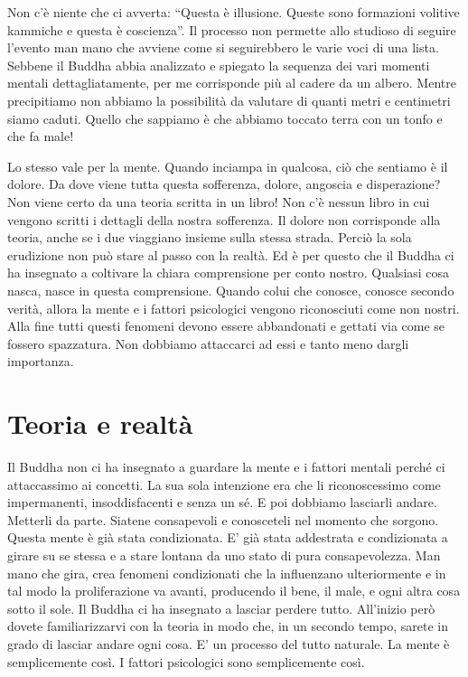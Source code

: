 Non c'è niente che ci avverta: ``Questa è illusione. Queste sono
formazioni volitive kammiche e questa è coscienza''. Il processo non
permette allo studioso di seguire l'evento man mano che avviene come si
seguirebbero le varie voci di una lista. Sebbene il Buddha abbia
analizzato e spiegato la sequenza dei vari momenti mentali
dettagliatamente, per me corrisponde più al cadere da un albero. Mentre
precipitiamo non abbiamo la possibilità da valutare di quanti metri e
centimetri siamo caduti. Quello che sappiamo è che abbiamo toccato terra
con un tonfo e che fa male!

Lo stesso vale per la mente. Quando inciampa in qualcosa, ciò che
sentiamo è il dolore. Da dove viene tutta questa sofferenza, dolore,
angoscia e disperazione? Non viene certo da una teoria scritta in un
libro! Non c'è nessun libro in cui vengono scritti i dettagli della
nostra sofferenza. Il dolore non corrisponde alla teoria, anche se i due
viaggiano insieme sulla stessa strada. Perciò la sola erudizione non può
stare al passo con la realtà. Ed è per questo che il Buddha ci ha
insegnato a coltivare la chiara comprensione per conto nostro. Qualsiasi
cosa nasca, nasce in questa comprensione. Quando colui che conosce,
conosce secondo verità, allora la mente e i fattori psicologici vengono
riconosciuti come non nostri. Alla fine tutti questi fenomeni devono
essere abbandonati e gettati via come se fossero spazzatura. Non
dobbiamo attaccarci ad essi e tanto meno dargli importanza.

\section{Teoria e realtà}

Il Buddha non ci ha insegnato a guardare la mente e i fattori mentali
perché ci attaccassimo ai concetti. La sua sola intenzione era che li
riconoscessimo come impermanenti, insoddisfacenti e senza un sé. E poi
dobbiamo lasciarli andare. Metterli da parte. Siatene consapevoli e
conosceteli nel momento che sorgono. Questa mente è già stata
condizionata. E' già stata addestrata e condizionata a girare su se
stessa e a stare lontana da uno stato di pura consapevolezza. Man mano
che gira, crea fenomeni condizionati che la influenzano ulteriormente e
in tal modo la proliferazione va avanti, producendo il bene, il male, e
ogni altra cosa sotto il sole. Il Buddha ci ha insegnato a lasciar
perdere tutto. All'inizio però dovete familiarizzarvi con la teoria in
modo che, in un secondo tempo, sarete in grado di lasciar andare ogni
cosa. E' un processo del tutto naturale. La mente è semplicemente così.
I fattori psicologici sono semplicemente così.

